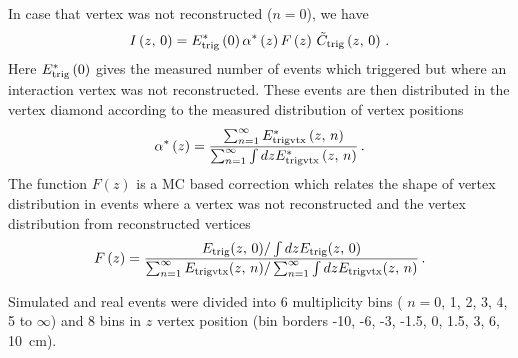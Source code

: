 \documentclass[ALICE,manyauthors]{ALICE_internal_notes}
\begin{document}
In case that vertex was not reconstructed ($n=0$), we have
\begin{equation}
  I\left(z,\, 0\right) = E^{*}_{\rm trig}\left(0\right)  \alpha^{*} \left(z\right) F\left(z\right)\,\tilde{C}_{\rm trig} \left(z,\,0\right)\,.
\end{equation}
Here $E^{*}_{\rm trig}\left(0\right)$ gives the measured number of events which triggered but where an
interaction vertex was not reconstructed. These events are then distributed in the vertex diamond according to
the measured distribution of vertex positions
\begin{equation}
\alpha^{*} \left(z\right)={ \sum_{n=1}^{\infty} E^{*}_{\rm trigvtx}\left(z,\, n\right)   \over
                            \sum_{n=1}^{\infty}\int dz E^{*}_{\rm trigvtx}\left(z,\, n\right)}\,.
\end{equation}
The function $F(z)$ is a MC based correction which relates the shape of vertex distribution in events where a vertex
was not reconstructed and  the vertex distribution from reconstructed vertices
\begin{equation}
F\left(z\right) = { E_{\rm trig}(z,\,0)/\int dz  E_{\rm trig}(z,\,0)   \over
\sum_{n=1}^{\infty} E_{\rm trigvtx}(z,\,n)/\sum_{n=1}^{\infty}\int dz  E_{\rm trigvtx}(z,\,n)
}\,.
\end{equation}

Simulated and real events were divided into
6 multiplicity bins ( $n=0$, 1, 2, 3, 4, 5 to $\infty$) and
8 bins in $z$ vertex position (bin borders -10, -6, -3, -1.5, 0, 1.5, 3, 6, 10~cm).
  
\end{document}
